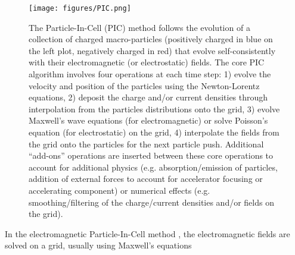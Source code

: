 \documentclass[]{report}
\begin{document}
\begin{figure}
\texttt{[image: figures/PIC.png]}
\caption{\label{fig:PIC} The Particle-In-Cell (PIC) method follows the evolution of a collection of charged macro-particles (positively charged in blue on the left plot, negatively charged in red) that evolve self-consistently with their electromagnetic (or electrostatic) fields. The core PIC algorithm involves four operations at each time step: 1) evolve the velocity and position of the particles using the Newton-Lorentz equations, 2) deposit the charge and/or current densities through interpolation from the particles distributions onto the grid, 3) evolve Maxwell's wave equations (for electromagnetic) or solve Poisson's equation (for electrostatic) on the grid, 4) interpolate the fields from the grid onto the particles for the next particle push. Additional ``add-ons'' operations are inserted between these core operations to account for additional physics (e.g. absorption/emission of particles, addition of external forces to account for accelerator focusing or accelerating component) or numerical effects (e.g. smoothing/filtering of the charge/current densities and/or fields on the grid).}
\end{figure}

In the electromagnetic Particle-In-Cell method \cite{Birdsalllangdon},
the electromagnetic fields are solved on a grid, usually using Maxwell's
equations
\end{document}
